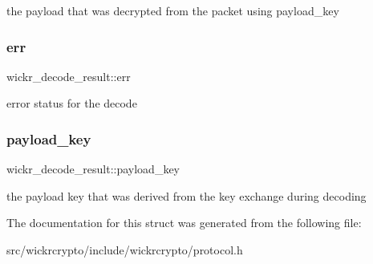 the payload that was decrypted from the packet using payload\+\_\+key \mbox{\label{structwickr__decode__result_a63449a59c8a8bab451f5ab555be7895d}} 
\subsubsection{\texorpdfstring{err}{err}}
{\footnotesize\ttfamily wickr\+\_\+decode\+\_\+result\+::err}

error status for the decode \mbox{\label{structwickr__decode__result_aed31d598b49bf696f286d673246d8b31}} 
\subsubsection{\texorpdfstring{payload\_key}{payload\_key}}
{\footnotesize\ttfamily wickr\+\_\+decode\+\_\+result\+::payload\+\_\+key}

the payload key that was derived from the key exchange during decoding 

The documentation for this struct was generated from the following file\+:\begin{DoxyCompactItemize}
\item 
src/wickrcrypto/include/wickrcrypto/protocol.\+h\end{DoxyCompactItemize}
